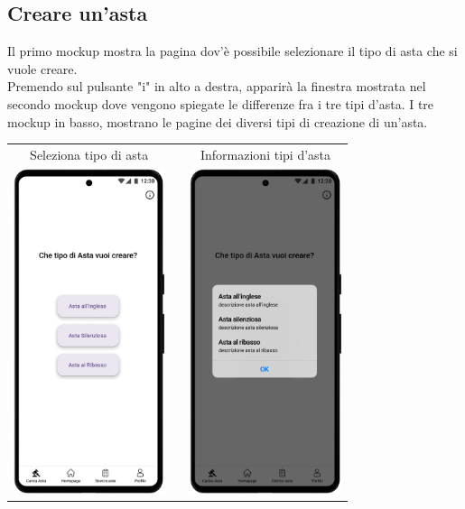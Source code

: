 \newpage
\subsection{Creare un'asta}
Il primo mockup mostra la pagina dov'è possibile selezionare il tipo di asta che si vuole creare.\\
Premendo sul pulsante "i" in alto a destra, apparirà la finestra mostrata nel secondo mockup dove vengono spiegate le differenze fra i tre tipi d'asta.\meskip
I tre mockup in basso, mostrano le pagine dei diversi tipi di creazione di un'asta.

\begin{center}
	\begin{tabular}{ccc}
		Seleziona tipo di asta                                           &  &
		Informazioni tipi d'asta                                                        \\
		\includegraphics[height=270pt]{assets/mockup/Carica Asta 1..png} &  &
		\includegraphics[height=270pt]{assets/mockup/Carica Asta 1. - informazioni.png} \\
	\end{tabular}
\end{center}
